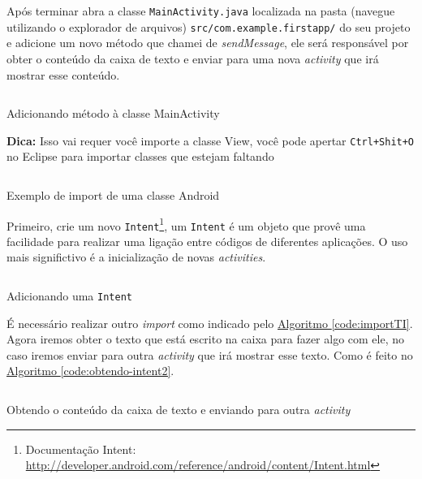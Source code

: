 \documentclass[a4paper,12pt,brazil,oneside]{book}
\begin{document}
Após terminar abra a classe \texttt{MainActivity.java} localizada na pasta (navegue utilizando o explorador de arquivos)
\texttt{src/com.example.firstapp/} do seu projeto e adicione um novo método que chamei de \emph{sendMessage}, ele será responsável por obter o conteúdo da caixa de texto e enviar para uma nova \emph{activity} que irá mostrar esse conteúdo.

\begin{listing}
\inputminted[linenos=true,fontsize=\small,frame=lines, framesep=2mm, tabsize=2,numbersep=5pt]{java}{src/firstapp/4.java}
\caption{Adicionando método à classe MainActivity}
\end{listing}

\begin{framed}
\textbf{Dica:} Isso vai requer você importe a classe View, você pode apertar \texttt{Ctrl+Shit+O} no Eclipse para importar classes que estejam faltando
\end{framed}

\begin{listing}
\inputminted[linenos=true,fontsize=\small,frame=lines, framesep=2mm, tabsize=2,numbersep=5pt]{java}{src/firstapp/4-2.java}
\caption{Exemplo de import de uma classe Android}
\end{listing}

Primeiro, crie um novo \texttt{Intent}\footnote{Documentação Intent: \href{http://developer.android.com/reference/android/content/Intent.html}{http://developer.android.com/reference/android/content/Intent.html}}, um \texttt{Intent} é um objeto que provê uma facilidade para realizar uma ligação entre códigos de diferentes aplicações. O uso mais significtivo é a inicialização de novas \emph{activities}.

\begin{listing}[H]
\inputminted[linenos=true,fontsize=\small,frame=lines, framesep=2mm, tabsize=2,numbersep=5pt]{java}{src/firstapp/5.java}
\caption{Adicionando uma \texttt{Intent}}
\label{code:obtendo-intent}
\end{listing}

É necessário realizar outro \emph{import} como indicado pelo \hyperref[code:importTI]{Algoritmo \ref*{code:importTI}}.
Agora iremos obter o texto que está escrito na caixa para fazer algo com ele, no caso iremos enviar para outra \emph{activity} que irá mostrar esse texto. Como é feito no \hyperref[code:obtendo-intent2]{Algoritmo \ref*{code:obtendo-intent2}}.

\begin{listing}[H]
\inputminted[linenos=true,fontsize=\small,frame=lines, framesep=2mm, tabsize=2,numbersep=5pt]{java}{src/firstapp/6.java}
\caption{Obtendo o conteúdo da caixa de texto e enviando para outra \emph{activity}}
\label{code:obtendo-intent2}
\end{listing}
\end{document}
